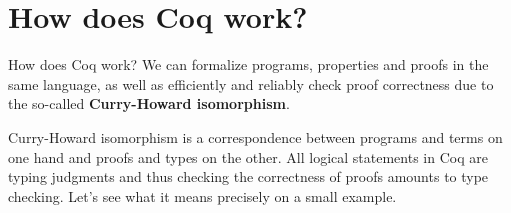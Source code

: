 \documentclass[10pt]{beamer}
\begin{document}
   \section{How does Coq work?}
\begin{frame}{How does Coq work?}
    We can formalize programs, properties and proofs in the same language, as well as efficiently and reliably check proof correctness due to the so-called {\bf Curry-Howard isomorphism}.

    Curry-Howard isomorphism is a correspondence between programs and terms on one hand and proofs and types on the other. All logical statements in Coq are typing judgments and thus checking the correctness of proofs amounts to type checking. Let's see what it means precisely on a small example.
   \end{frame}
   
\end{document}
